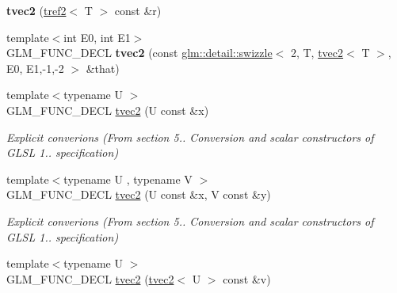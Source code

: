 \begin{DoxyCompactItemize}
\item 
\hypertarget{structglm_1_1detail_1_1tvec2_a343fdf7daa477b63a88aab1a61c1d83a}{{\bfseries tvec2} (\hyperlink{structglm_1_1detail_1_1tref2}{tref2}$<$ \-T $>$ const \&r)}\label{structglm_1_1detail_1_1tvec2_a343fdf7daa477b63a88aab1a61c1d83a}

\item 
\hypertarget{structglm_1_1detail_1_1tvec2_add0938d9c87c7a301ee3f49d8a0b4eb5}{{\footnotesize template$<$int \-E0, int \-E1$>$ }\\\-G\-L\-M\-\_\-\-F\-U\-N\-C\-\_\-\-D\-E\-C\-L {\bfseries tvec2} (const \hyperlink{structglm_1_1detail_1_1swizzle}{glm\-::detail\-::swizzle}$<$ 2, \-T, \hyperlink{structglm_1_1detail_1_1tvec2}{tvec2}$<$ \-T $>$, \-E0, \-E1,-\/1,-\/2 $>$ \&that)}\label{structglm_1_1detail_1_1tvec2_add0938d9c87c7a301ee3f49d8a0b4eb5}

\item 
\hypertarget{structglm_1_1detail_1_1tvec2_acec9b5852d2e93f20ff7817999b01d73}{{\footnotesize template$<$typename U $>$ }\\\-G\-L\-M\-\_\-\-F\-U\-N\-C\-\_\-\-D\-E\-C\-L \hyperlink{structglm_1_1detail_1_1tvec2_acec9b5852d2e93f20ff7817999b01d73}{tvec2} (\-U const \&x)}\label{structglm_1_1detail_1_1tvec2_acec9b5852d2e93f20ff7817999b01d73}

\begin{DoxyCompactList}\small\item\em \-Explicit converions (\-From section 5.. \-Conversion and scalar constructors of \-G\-L\-S\-L 1.. specification) \end{DoxyCompactList}\item 
\hypertarget{structglm_1_1detail_1_1tvec2_a2da38cf17c51fc375d3d04dd14f515c3}{{\footnotesize template$<$typename U , typename V $>$ }\\\-G\-L\-M\-\_\-\-F\-U\-N\-C\-\_\-\-D\-E\-C\-L \hyperlink{structglm_1_1detail_1_1tvec2_a2da38cf17c51fc375d3d04dd14f515c3}{tvec2} (\-U const \&x, \-V const \&y)}\label{structglm_1_1detail_1_1tvec2_a2da38cf17c51fc375d3d04dd14f515c3}

\begin{DoxyCompactList}\small\item\em \-Explicit converions (\-From section 5.. \-Conversion and scalar constructors of \-G\-L\-S\-L 1.. specification) \end{DoxyCompactList}\item 
\hypertarget{structglm_1_1detail_1_1tvec2_ac62143e85db688ebdd281d60c237dda7}{{\footnotesize template$<$typename U $>$ }\\\-G\-L\-M\-\_\-\-F\-U\-N\-C\-\_\-\-D\-E\-C\-L \hyperlink{structglm_1_1detail_1_1tvec2_ac62143e85db688ebdd281d60c237dda7}{tvec2} (\hyperlink{structglm_1_1detail_1_1tvec2}{tvec2}$<$ \-U $>$ const \&v)}\label{structglm_1_1detail_1_1tvec2_ac62143e85db688ebdd281d60c237dda7}


\end{DoxyCompactItemize}
